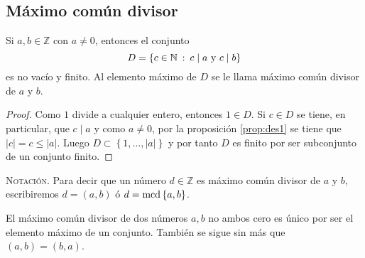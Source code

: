 \subsection{Máximo común divisor}

\begin{proposition}
\label{prop:mcd1}Si $a,b\in \mathbb{Z}$ con $a\neq 0$, entonces el conjunto 
\begin{equation*}
	D=\left\{c\in \mathbb{N} \: : \: c \mid a\textnormal{ y }c \mid b\right\}
\end{equation*}
es no vacío y finito. Al elemento máximo de $D$ se le llama máximo común divisor de $a$ y $b$.
\end{proposition}
\begin{proof}
Como $1$ divide a cualquier entero, entonces $1\in D$. Si $c\in D$ se tiene, en particular, que $c \mid a$ y como $a\neq 0$, por la proposición \eqref{prop:des1} se tiene que $|c|=c\leq |a|$. Luego $D\subset \left\{1,\ldots ,|a|\right\}$ y por tanto $D$ es finito por ser subconjunto de un conjunto finito.
\end{proof}
\bigskip

\textsc{Notación}. Para decir que un número $d\in \mathbb{Z}$ es máximo común divisor de $a$ y $b$, escribiremos $d=(a,b)$ ó $d=\textnormal{mcd}\left\{a,b\right\}$.

\begin{remark}
El máximo común divisor de dos números $a,b$ no ambos cero es único por ser el elemento máximo de un conjunto. También se sigue sin más que $(a,b)=(b,a)$.
\end{remark}

